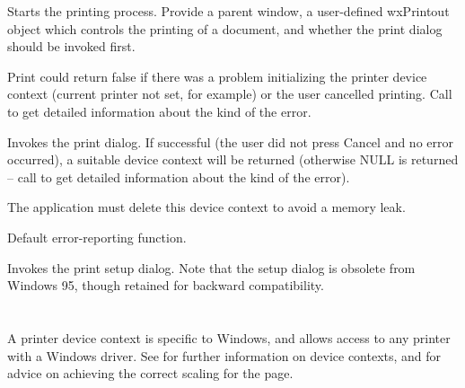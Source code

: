 Starts the printing process. Provide a parent window, a user-defined wxPrintout object which controls
the printing of a document, and whether the print dialog should be invoked first.

Print could return false if there was a problem initializing the printer device context
(current printer not set, for example) or the user cancelled printing. Call
 to get detailed
information about the kind of the error.


\label{wxprinterprintdialog}


Invokes the print dialog. If successful (the user did not press Cancel
and no error occurred), a suitable device context will be returned
(otherwise NULL is returned -- call
 to get detailed
information about the kind of the error).

The application must delete this device context to avoid a memory leak.


\label{wxprinterreporterror}


Default error-reporting function.


\label{wxprintersetup}


Invokes the print setup dialog. Note that the setup dialog is obsolete from
Windows 95, though retained for backward compatibility.

\section{}\label{wxprinterdc}

A printer device context is specific to Windows, and allows access to
any printer with a Windows driver. See  for further information
on device contexts, and  for advice on
achieving the correct scaling for the page.


\\

